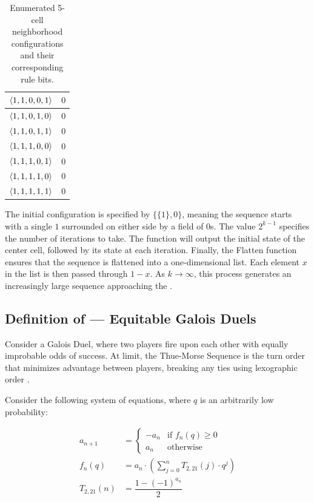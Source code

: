 \documentclass[conference]{IEEEtran}
\begin{document}
\begin{table}[h]
\begin{tabular}{|c|c|}
$\langle 1,1,0,0,1 \rangle$ & $0$ \\ \hline
$\langle 1,1,0,1,0 \rangle$ & $0$ \\ \hline
$\langle 1,1,0,1,1 \rangle$ & $0$ \\ \hline
$\langle 1,1,1,0,0 \rangle$ & $0$ \\ \hline
$\langle 1,1,1,0,1 \rangle$ & $0$ \\ \hline
$\langle 1,1,1,1,0 \rangle$ & $0$ \\ \hline
$\langle 1,1,1,1,1 \rangle$ & $0$ \\ \hline
\end{tabular}
\caption{Enumerated 5-cell neighborhood configurations and their corresponding rule bits.}
\end{table}

The initial configuration is specified by $\{\{1\},0\}$, meaning the sequence starts with a single $1$ surrounded on either side by a field of $0$s. The value $2^{k-1}$ specifies the number of iterations to take. The function will output the initial state of the center cell, followed by its state at each iteration. Finally, the Flatten function ensures that the sequence is flattened into a one-dimensional list. Each element $x$ in the list is then passed through $1 - x$. As $k\to\infty$, this process generates an increasingly large sequence approaching the \TMS.

\subsection{Definition  of \TotalOriginals\xspace --- Equitable Galois Duels}

Consider a Galois Duel, where two players fire upon each other with equally improbable odds of success. At limit, the Thue-Morse Sequence is the turn order that minimizes advantage between players, breaking any ties using lexographic order \cite{cooper_2011}.

Consider the following system of equations, where $q$ is an arbitrarily low probability:

\begin{equation}
\begin{aligned}
    a_{n+1} &= \begin{cases}
            -a_n &\text{if } f_n(q) \ge 0 \\
            a_n  &\text{otherwise}
       \end{cases} \\
     f_n(q) &= a_n \cdot \left( \sum_{j=0}^n T_{2,21}(j) \cdot q^j \right) \\
T_{2,21}(n) &= \dfrac{1 - (-1)^{a_n}}{2}
\end{aligned}
\end{equation}
\end{document}
